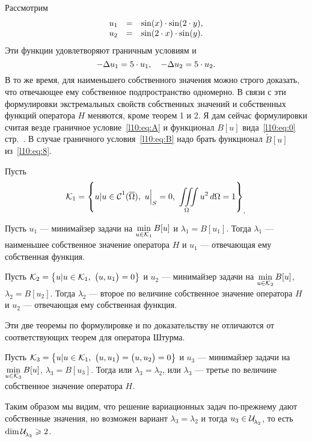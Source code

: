 \noindent Рассмотрим 
\begin{equation*}
	\hfill\begin{array}{rcl}
		u_1&=&\sin(x)\cdot\sin(2\cdot y),\\
		u_2&=&\sin(2\cdot x)\cdot\sin(y).
	\end{array}\hfill
\end{equation*}
Эти функции удовлетворяют граничным условиям и 
\begin{equation*}
	\hfill-\Delta u_1=5\cdot u_1,\quad-\Delta u_2=5\cdot u_2.\hfill
\end{equation*}
В то же время, для наименьшего собственного значения можно строго доказать, что отвечающее ему собственное подпространство одномерно. В связи с эти формулировки экстремальных свойств собственных значений и собственных функций оператора $H$ меняются, кроме теорем 1 и 2. Я дам сейчас формулировки считая везде граничное условие~\eqref{l10:eq:A} и функционал $B[u]$ вида~\eqref{l10:eq:0} стр.~\pageref{l10:eq:0}. В случае граничного условия~\eqref{l10:eq:B} надо брать функционал $\widetilde{B}[u]$ из~\eqref{l10:eq:8}. 

Пусть 
\begin{equation*}
	\hfill\K_1=\left\{u|u\in\Cfn{1}(\overline{\Omega}),\ u\Big|_{S}=0,\ \iiint\limits_{\Omega}u^2\,d\Omega=1\right\}_{\displaystyle.}\hfill
\end{equation*} 
\begin{_teor}
	Пусть $u_1$ --- минимайзер задачи на $\displaystyle\min\limits_{u\in\K_1}B[u]$ и $\lambda_1=B[u_1]$. Тогда $\lambda_1$ --- наименьшее собственное значение оператора $H$ и $u_1$ --- отвечающая ему собственная функция.
\end{_teor}
\begin{_teor}
	Пусть $\K_2=\left\{u|u\in\K_1,\ \big(u,u_1\big)=0\right\}$ и $u_2$ --- минимайзер задачи на $\displaystyle\min\limits_{u\in\K_2}B[u]$, $\lambda_2=B[u_2]$. Тогда $\lambda_2$ --- второе по величине собственное значение оператора $H$ и $u_2$ --- отвечающая ему собственная функция.
\end{_teor}
Эти две теоремы по формулировке и по доказательству не отличаются от соответствующих теорем для оператора Штурма.
\begin{_teor}
	Пусть $\K_3=\left\{u|u\in\K_1,\ \big(u,u_1\big)=\big(u,u_2\big)=0\right\}$ и $u_3$ --- минимайзер задачи на $\displaystyle\min\limits_{u\in\K_3}B[u]$, $\lambda_3=B[u_3]$. Тогда или $\lambda_3=\lambda_2$, или $\lambda_3$ --- третье по величине собственное значение оператора $H$. 
\end{_teor}
Таким образом мы видим, что решение вариационных задач по-прежнему дают собственные значения, но возможен вариант $\lambda_3=\lambda_2$ и тогда $u_3\in\Ul[\lambda_2]$, то есть $\dim\Ul[\lambda_2]\geqslant2$.

